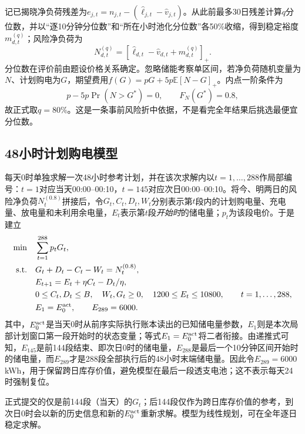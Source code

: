 \documentclass[UTF8,fontset=none,12pt,a4paper]{ctexart}
\newcommand{\E}{\mathbb E}
\begin{document}
记已揭晓净负荷残差为$e_{j,t}=n_{j,t}-(\widehat\ell_{j,t}-\widehat v_{j,t})$。从此前最多30日残差计算$q$分位数，并以“逐10分钟分位数”和“所在小时池化分位数”各50\%收缩，得到稳定裕度$m_{d,t}^{(q)}$；风险净负荷为
\begin{equation}
 N_{d,t}^{(q)}=\left[\widehat\ell_{d,t}-\widehat v_{d,t}+m_{d,t}^{(q)}\right]_+.
 \label{eq:risknet}
\end{equation}
分位数在评价前由题设价格关系确定。忽略储能考察单区间，若净负荷随机变量为$N$、计划购电为$G$，期望费用$f(G)=pG+5p\E[N-G]_+$。内点一阶条件为
\begin{equation}
 p-5p\Pr(N>G^*)=0,\qquad F_N(G^*)=0.8,
 \label{eq:quantile}
\end{equation}
故正式取$q=80\%$。这是一条事前风险折中依据，不是看完全年结果后挑选最便宜分位数。

\subsection{48小时计划购电模型}
每天0时单独求解一次48小时参考计划，并在该次求解内以$t=1,\ldots,288$作局部编号：$t=1$对应当天00:00--00:10，$t=145$对应次日00:00--00:10。将今、明两日的风险净负荷$N_t^{(0.8)}$拼接后，令$G_t,C_t,D_t,W_t$分别表示第$t$段内的计划购电量、充电量、放电量和未利用余电量，$E_t$表示第$t$段\emph{开始时}的储电量；$p_t$为该段电价。于是建立
\begin{align}
 \min\quad&\sum_{t=1}^{288}p_tG_t,\label{eq:q2plan}\\
 \text{s.t.}\quad&G_t+D_t-C_t-W_t=N_t^{(0.8)},\nonumber\\
 &E_{t+1}=E_t+\eta C_t-D_t/\eta,\nonumber\\
 &0\le C_t,D_t\le B,\quad W_t,G_t\ge0,\quad1200\le E_t\le10800,
 \qquad t=1,\ldots,288,\nonumber\\
 &E_1=E_0^{\rm act},\qquad E_{289}=6000.\label{eq:q2terminal}
\end{align}
其中，$E_0^{\rm act}$是当天0时从前序实际执行账本读出的已知储电量参数，$E_1$则是本次局部计划窗口第一段开始时的状态变量；等式$E_1=E_0^{\rm act}$将二者衔接。由递推式可知，$E_{145}$是前144段结束、即次日0时的储电量，$E_{288}$是最后一个10分钟区间开始时的储电量，而$E_{289}$才是288段全部执行后的48小时末端储电量。因此令$E_{289}=6000$ kWh，用于保留跨日库存价值，避免模型在最后一段透支电池；这不表示每天24时强制复位。

正式提交的仅是前144段（当天）的$G_t$；后144段仅作为跨日库存价值的参考，到次日0时会以新的历史信息和新的$E_0^{\rm act}$重新求解。模型为线性规划，可在全年逐日稳定求解。
\end{document}
